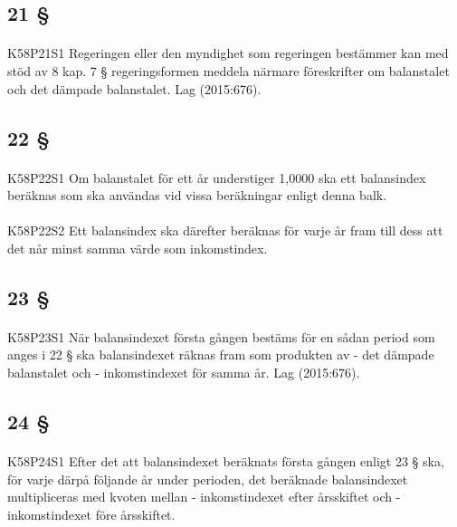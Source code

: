 \documentclass[a4paper,notitlepage,openany,10pt]{book}
\begin{document}
\subsection*{21 §}
\paragraph*{}
{\tiny K58P21S1}
Regeringen eller den myndighet som regeringen bestämmer kan med stöd av 8 kap. 7 § regeringsformen meddela närmare föreskrifter om balanstalet och det dämpade balanstalet.
Lag (2015:676).
\subsection*{22 §}
\paragraph*{}
{\tiny K58P22S1}
Om balanstalet för ett år understiger 1,0000 ska ett balansindex beräknas som ska användas vid vissa beräkningar enligt denna balk.
\paragraph*{}
{\tiny K58P22S2}
Ett balansindex ska därefter beräknas för varje år fram till dess att det når minst samma värde som inkomstindex.
\subsection*{23 §}
\paragraph*{}
{\tiny K58P23S1}
När balansindexet första gången bestäms för en sådan period som anges i 22 § ska balansindexet räknas fram som produkten av
\newline - det dämpade balanstalet och
\newline - inkomstindexet för samma år.
Lag (2015:676).
\subsection*{24 §}
\paragraph*{}
{\tiny K58P24S1}
Efter det att balansindexet beräknats första gången enligt 23 § ska, för varje därpå följande år under perioden, det beräknade balansindexet multipliceras med kvoten mellan
\newline - inkomstindexet efter årsskiftet och
\newline - inkomstindexet före årsskiftet.
\end{document}
